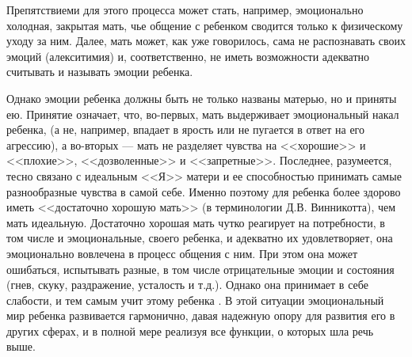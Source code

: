 \documentclass{../../common/thesisbyxetex}
\begin{document}
Препятствиеми для этого процесса может стать, например, эмоционально холодная, закрытая мать, чье 
общение с ребенком сводится только к физическому уходу за ним. Далее, мать может, как уже 
говорилось, сама не распознавать своих эмоций (алекситимия) и, соответственно, не иметь возможности 
адекватно считывать и называть эмоции ребенка. 

Однако эмоции ребенка должны быть не только названы матерью, но и приняты ею. Принятие означает, 
что, во-первых, мать выдерживает эмоциональный накал ребенка, (а не, например, впадает в ярость или 
не пугается в ответ на его агрессию), а во-вторых --- мать не разделяет чувства на <<хорошие>> и 
<<плохие>>, <<дозволенные>> и <<запретные>>. Последнее, разумеется, тесно связано с идеальным <<Я>> 
матери и ее способностью принимать самые разнообразные чувства в самой себе. Именно поэтому 
для ребенка более здорово иметь <<достаточно хорошую мать>> (в терминологии Д.В. Винникотта), чем 
мать идеальную. Достаточно хорошая мать чутко реагирует на потребности, в том числе и 
эмоциональные, своего ребенка, и адекватно их удовлетворяет, она эмоционально вовлечена в процесс 
общения с ним. При этом она может ошибаться, испытывать разные, в том числе отрицательные эмоции и 
состояния (гнев, скуку, раздражение, усталость и т.д.). Однако она принимает в себе слабости, и 
тем 
самым учит этому ребенка \cite{vindeti,vinraz}. В этой ситуации эмоциональный мир ребенка 
развивается гармонично, давая надежную опору для развития его в других сферах, и в полной мере 
реализуя все функции, о которых шла речь выше.








\printbibliography[env=gostbibliography,sorting=ntvy]
\end{document}
